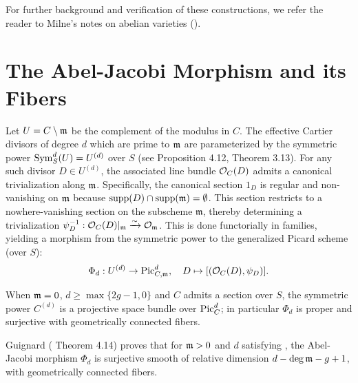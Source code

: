 For further background and verification of these constructions, we refer the reader to Milne's notes on abelian varieties (\cite{milneAV}).


\section{The Abel-Jacobi Morphism and its Fibers}\label{section:AbelJacobi}


Let $U = C \setminus \mdls$ be the complement of the modulus in $C$.
The effective Cartier divisors of degree $d$ which are prime to $\mdls$ are parameterized by the symmetric power $\Sym_S^d (U) = U^{(d)}$ over $S$ (see \cite{Guignard2018} Proposition 4.12, \cite{milneAV} Theorem 3.13).
For any such divisor $D \in U^{(d)}$, the associated line bundle $\Oo_C(D)$ admits a canonical trivialization along $\mdls$.
Specifically, the canonical section $1_D$ is regular and non-vanishing on $\mdls$ because $\operatorname{supp}(D) \cap \operatorname{supp}(\mdls) = \emptyset$.
This section restricts to a nowhere-vanishing section on the subscheme $\mathfrak{m}$, thereby determining a trivialization $\psi_D^{-1}: \Oo_C(D)|_{\mdls} \xrightarrow{\sim} \Oo_{\mdls}$.
This is done functorially in families, yielding a morphism from the symmetric power to the generalized Picard scheme (over $S$):
\begin{equation}
    \Phi_{d}: U^{(d)} \to \Pic^d_{C, \mathfrak{m}}, \quad D \mapsto [(\mathcal{O}_C(D), \psi_D)].
\end{equation}

When $\mdls = 0$, $d \geq \max \{2g - 1, 0\}$ and $C$ admits a section over $S$, the symmetric power $C^{(d)}$ is a projective space bundle over $\PicC[d]$;
in particular $\Phi_d$ is proper and surjective with geometrically connected fibers.

Guignard (\cite{Guignard2018} Theorem 4.14) proves that for $\mdls > 0$ and $d$ satisfying , the Abel-Jacobi morphism $\Phi_d$ is
surjective smooth of relative dimension $d - \deg \mdls - g + 1$, with geometrically connected fibers.

